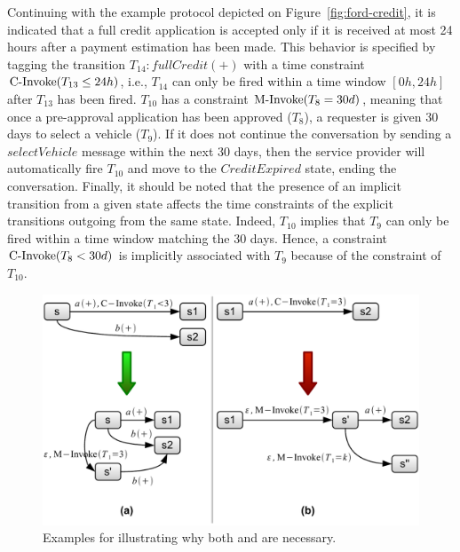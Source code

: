 Continuing with the example protocol depicted on Figure~\ref{fig:ford-credit}, it is indicated that a full credit application is accepted only if it is received at most 24 hours after a payment estimation has been made. This behavior is specified by tagging the transition $T_{14}: fullCredit(+)$ with a time constraint $\mbox{C-Invoke}(T_{13} \leq 24h)$, i.e., $T_{14}$ can only be fired within a time window $[0h, 24h]$ after $T_{13}$ has been fired. $T_{10}$ has a constraint $\mbox{M-Invoke}(T_8 = 30d)$, meaning that once a pre-approval application has been approved ($T_8$), a requester is given 30 days to select a vehicle ($T_9$). If it does not continue the conversation by sending a $selectVehicle$ message within the next 30 days, then the service provider will automatically fire $T_{10}$ and move to the $CreditExpired$ state, ending the conversation. Finally, it should be noted that the presence of an implicit transition from a given state affects the time constraints of the explicit transitions outgoing from the same state. Indeed, $T_{10}$ implies that $T_9$ can only be fired within a time window matching the 30 days. Hence, a constraint $\mbox{C-Invoke}(T_8 < 30d)$ is implicitly associated with $T_9$ because of the \MInvoke constraint of $T_{10}$.\\

\begin{figure}[htbp]
    \centering
    \includegraphics[width=\textwidth]{content/protocol-model/ci-vs-mi}
    \caption{Examples for illustrating why both \CInvoke and \MInvoke are necessary.}
    \label{fig:ci-vs-mi}
\end{figure}

